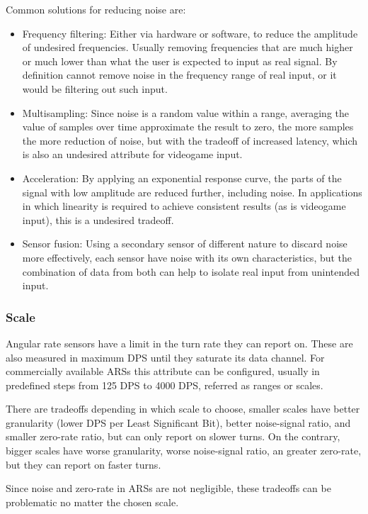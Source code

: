 \documentclass[10pt, twocolumn, a4paper]{article}
\begin{document}
        Common solutions for reducing noise are:
        \begin{itemize}
            \item Frequency filtering: Either via hardware or software, to reduce the amplitude of undesired frequencies. Usually removing frequencies that are much higher or much lower than what the user is expected to input as real signal. By definition cannot remove noise in the frequency range of real input, or it would be filtering out such input.
            \item Multisampling: Since noise is a random value within a range, averaging the value of samples over time approximate the result to zero, the more samples the more reduction of noise, but with the tradeoff of increased latency, which is also an undesired attribute for videogame input.
            \item Acceleration: By applying an exponential response curve, the parts of the signal with low amplitude are reduced further, including noise. In applications in which linearity is required to achieve consistent results (as is videogame input), this is a undesired tradeoff.
            \item Sensor fusion: Using a secondary sensor of different nature to discard noise more effectively, each sensor have noise with its own characteristics, but the combination of data from both can help to isolate real input from unintended input.
        \end{itemize}

    \subsubsection{Scale}
    \label{problem.scale}
        Angular rate sensors have a limit in the turn rate they can report on. These are also measured in maximum DPS until they saturate its data channel. For commercially available ARSs this attribute can be configured, usually in predefined steps from 125 DPS to 4000 DPS, referred as ranges or scales.

        There are tradeoffs depending in which scale to choose, smaller scales have better granularity (lower DPS per Least Significant Bit), better noise-signal ratio, and smaller zero-rate ratio, but can only report on slower turns. On the contrary, bigger scales have worse granularity, worse noise-signal ratio, an greater zero-rate, but they can report on faster turns.

        Since noise and zero-rate in ARSs are not negligible, these tradeoffs can be problematic no matter the chosen scale.
\end{document}
